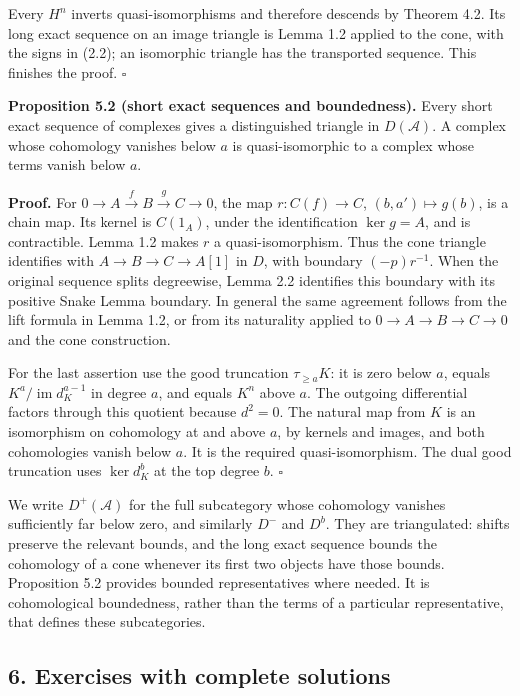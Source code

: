 \documentclass[
  english,
  11pt,
  a4paper,
]{article}
\begin{document}
Every \(H^n\) inverts quasi-isomorphisms and therefore descends by
Theorem 4.2. Its long exact sequence on an image triangle is Lemma 1.2
applied to the cone, with the signs in (2.2); an isomorphic triangle has
the transported sequence. This finishes the proof. \(\square\)

\textbf{Proposition 5.2 (short exact sequences and boundedness).} Every
short exact sequence of complexes gives a distinguished triangle in
\(D(\mathcal A)\). A complex whose cohomology vanishes below \(a\) is
quasi-isomorphic to a complex whose terms vanish below \(a\).

\textbf{Proof.} For \(0\to A\xrightarrow fB\xrightarrow gC\to0\), the
map \(r:C(f)\to C\), \((b,a')\mapsto g(b)\), is a chain map. Its kernel
is \(C(1_A)\), under the identification \(\ker g=A\), and is
contractible. Lemma 1.2 makes \(r\) a quasi-isomorphism. Thus the cone
triangle identifies with \(A\to B\to C\to A[1]\) in \(D\), with boundary
\((-p)r^{-1}\). When the original sequence splits degreewise, Lemma 2.2
identifies this boundary with its positive Snake Lemma boundary. In
general the same agreement follows from the lift formula in Lemma 1.2,
or from its naturality applied to \(0\to A\to B\to C\to0\) and the cone
construction.

For the last assertion use the good truncation \(\tau_{\ge a}K\): it is
zero below \(a\), equals \(K^a/\operatorname{im}d_K^{a-1}\) in degree
\(a\), and equals \(K^n\) above \(a\). The outgoing differential factors
through this quotient because \(d^2=0\). The natural map from \(K\) is
an isomorphism on cohomology at and above \(a\), by kernels and images,
and both cohomologies vanish below \(a\). It is the required
quasi-isomorphism. The dual good truncation uses \(\ker d_K^b\) at the
top degree \(b\). \(\square\)

We write \(D^+(\mathcal A)\) for the full subcategory whose cohomology
vanishes sufficiently far below zero, and similarly \(D^-\) and \(D^b\).
They are triangulated: shifts preserve the relevant bounds, and the long
exact sequence bounds the cohomology of a cone whenever its first two
objects have those bounds. Proposition 5.2 provides bounded
representatives where needed. It is cohomological boundedness, rather
than the terms of a particular representative, that defines these
subcategories.

\subsection{6. Exercises with complete
solutions}\label{complexes-cones-and-localization--6-exercises-with-complete-solutions}
\end{document}
